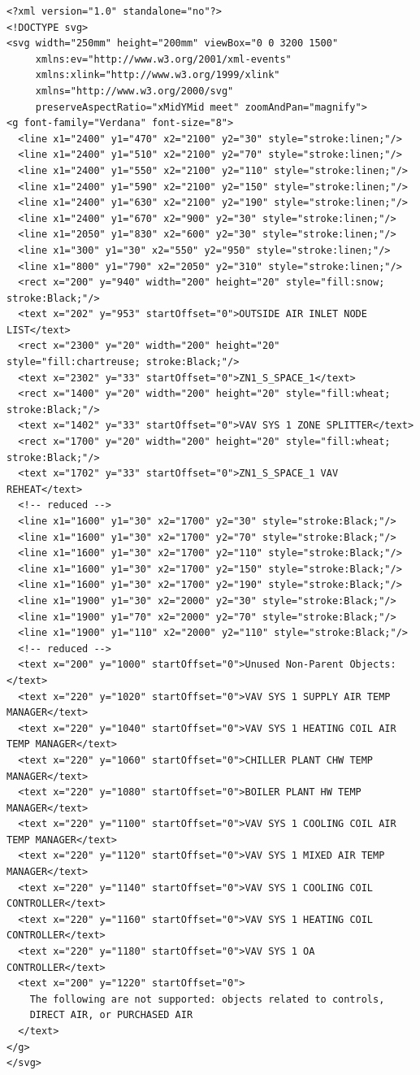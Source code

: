 \begin{lstlisting}
<?xml version="1.0" standalone="no"?>
<!DOCTYPE svg>
<svg width="250mm" height="200mm" viewBox="0 0 3200 1500"
     xmlns:ev="http://www.w3.org/2001/xml-events"
     xmlns:xlink="http://www.w3.org/1999/xlink"
     xmlns="http://www.w3.org/2000/svg"
     preserveAspectRatio="xMidYMid meet" zoomAndPan="magnify">
<g font-family="Verdana" font-size="8">
  <line x1="2400" y1="470" x2="2100" y2="30" style="stroke:linen;"/>
  <line x1="2400" y1="510" x2="2100" y2="70" style="stroke:linen;"/>
  <line x1="2400" y1="550" x2="2100" y2="110" style="stroke:linen;"/>
  <line x1="2400" y1="590" x2="2100" y2="150" style="stroke:linen;"/>
  <line x1="2400" y1="630" x2="2100" y2="190" style="stroke:linen;"/>
  <line x1="2400" y1="670" x2="900" y2="30" style="stroke:linen;"/>
  <line x1="2050" y1="830" x2="600" y2="30" style="stroke:linen;"/>
  <line x1="300" y1="30" x2="550" y2="950" style="stroke:linen;"/>
  <line x1="800" y1="790" x2="2050" y2="310" style="stroke:linen;"/>
  <rect x="200" y="940" width="200" height="20" style="fill:snow; stroke:Black;"/>
  <text x="202" y="953" startOffset="0">OUTSIDE AIR INLET NODE LIST</text>
  <rect x="2300" y="20" width="200" height="20" style="fill:chartreuse; stroke:Black;"/>
  <text x="2302" y="33" startOffset="0">ZN1_S_SPACE_1</text>
  <rect x="1400" y="20" width="200" height="20" style="fill:wheat; stroke:Black;"/>
  <text x="1402" y="33" startOffset="0">VAV SYS 1 ZONE SPLITTER</text>
  <rect x="1700" y="20" width="200" height="20" style="fill:wheat; stroke:Black;"/>
  <text x="1702" y="33" startOffset="0">ZN1_S_SPACE_1 VAV REHEAT</text>
  <!-- reduced -->
  <line x1="1600" y1="30" x2="1700" y2="30" style="stroke:Black;"/>
  <line x1="1600" y1="30" x2="1700" y2="70" style="stroke:Black;"/>
  <line x1="1600" y1="30" x2="1700" y2="110" style="stroke:Black;"/>
  <line x1="1600" y1="30" x2="1700" y2="150" style="stroke:Black;"/>
  <line x1="1600" y1="30" x2="1700" y2="190" style="stroke:Black;"/>
  <line x1="1900" y1="30" x2="2000" y2="30" style="stroke:Black;"/>
  <line x1="1900" y1="70" x2="2000" y2="70" style="stroke:Black;"/>
  <line x1="1900" y1="110" x2="2000" y2="110" style="stroke:Black;"/>
  <!-- reduced -->
  <text x="200" y="1000" startOffset="0">Unused Non-Parent Objects:</text>
  <text x="220" y="1020" startOffset="0">VAV SYS 1 SUPPLY AIR TEMP MANAGER</text>
  <text x="220" y="1040" startOffset="0">VAV SYS 1 HEATING COIL AIR TEMP MANAGER</text>
  <text x="220" y="1060" startOffset="0">CHILLER PLANT CHW TEMP MANAGER</text>
  <text x="220" y="1080" startOffset="0">BOILER PLANT HW TEMP MANAGER</text>
  <text x="220" y="1100" startOffset="0">VAV SYS 1 COOLING COIL AIR TEMP MANAGER</text>
  <text x="220" y="1120" startOffset="0">VAV SYS 1 MIXED AIR TEMP MANAGER</text>
  <text x="220" y="1140" startOffset="0">VAV SYS 1 COOLING COIL CONTROLLER</text>
  <text x="220" y="1160" startOffset="0">VAV SYS 1 HEATING COIL CONTROLLER</text>
  <text x="220" y="1180" startOffset="0">VAV SYS 1 OA CONTROLLER</text>
  <text x="200" y="1220" startOffset="0">
    The following are not supported: objects related to controls,
    DIRECT AIR, or PURCHASED AIR
  </text>
</g>
</svg>
\end{lstlisting}
